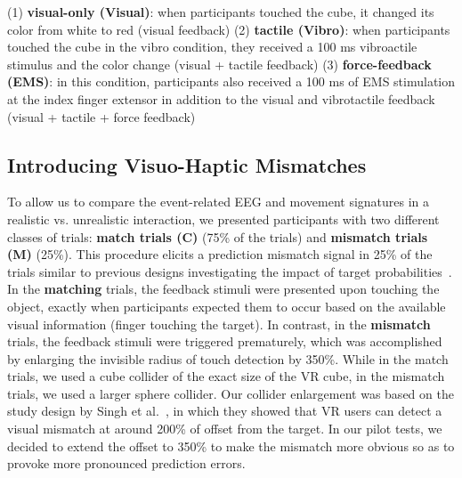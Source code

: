 (1) \textbf{visual-only (Visual)}: when participants touched the cube, it changed its color from white to red (visual feedback)
\indent(2) \textbf{tactile (Vibro)}: when participants touched the cube in the vibro condition, they received a 100 ms vibroactile stimulus and the color change (visual + tactile feedback)
\indent(3) \textbf{force-feedback (EMS)}: in this condition, participants also received a 100 ms of EMS stimulation at the index finger extensor in addition to the visual and vibrotactile feedback (visual + tactile + force feedback)


\subsection{Introducing Visuo-Haptic Mismatches}
To allow us to compare the event-related EEG and movement signatures in a realistic vs. unrealistic interaction, we presented participants with two different classes of trials: \textbf{match trials (C)} (75\% of the trials) and \textbf{mismatch trials (M)} (25\%). This procedure elicits a prediction mismatch signal in 25\% of the trials similar to previous designs investigating the impact of target probabilities~\cite{polich_updating_2007}.  %
In the \textbf{matching} trials, the feedback stimuli were presented upon touching the object, exactly when participants expected them to occur based on the available visual information (finger touching the target). In contrast, in the \textbf{mismatch} trials, the feedback stimuli were triggered prematurely, which was accomplished by enlarging the invisible radius of touch detection by 350\%. While in the match trials, we used a cube collider of the exact size of the VR cube, in the mismatch trials, we used a larger sphere collider. Our collider enlargement was based on the study design by Singh et al.~\cite{singh_visual_20008}, in which they showed that VR users can detect a visual mismatch at around 200\% of offset from the target. In our pilot tests, we decided to extend the offset to 350\% to make the mismatch more obvious so as to provoke more pronounced prediction errors. 

